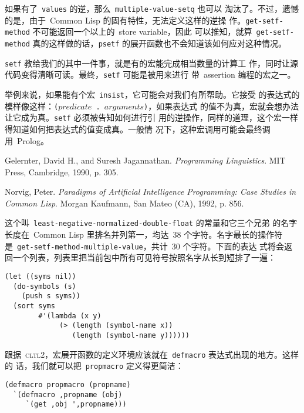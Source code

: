 \begin{notes}
如果有了~\texttt{values} 的逆，那么~\texttt{multiple-value-setq} 也可以
淘汰了。不过，遗憾的是，由于~Common Lisp 的固有特性，无法定义这样的逆操
作。\texttt{get-setf-method} 不可能返回一个以上的~store variable，因此
可以推知，就算~\texttt{get-setf-method} 真的这样做的话，\texttt{psetf}
的展开函数也不会知道该如何应对这种情况。


\texttt{setf} 教给我们的其中一件事，就是有的宏能完成相当数量的计算工
作，同时让源代码变得清晰可读。最终，\texttt{setf} 可能是被用来进行
带~assertion 编程的宏之一。

举例来说，如果能有个宏~\texttt{insist}，它可能会对我们有所帮助。它接受
的表达式的模样像这样：\texttt{($predicate$ . $arguments$)}，如果表达式
的值不为真，宏就会想办法让它成为真。\texttt{setf} 必须被告知如何进行引
用的逆操作，同样的道理，这个宏一样得知道如何把表达式的值变成真。一般情
况下，这种宏调用可能会最终调用~Prolog。


Gelernter, David H., and Suresh Jagannathan. \emph{Programming Linguistics}.
MIT Press, Cambridge, 1990, p. 305.


Norvig, Peter. \emph{Paradigms of Artificial Intelligence Programming: Case
Studies in Common Lisp}. Morgan Kaufmann, San Mateo (CA), 1992, p. 856.


这个叫~\texttt{least-negative-normalized-double-float} 的常量和它三个兄弟
的名字长度在~Common Lisp 里排名并列第一，均达~38 个字符。名字最长的操作符
是~\texttt{get-setf-method-multiple-value}，共计~30 个字符。下面的表达
式将会返回一个列表，列表里把当前包中所有可见符号按照名字从长到短排了一遍：
     
\begin{verbatim}
(let ((syms nil))
  (do-symbols (s)
    (push s syms))
  (sort syms
        #'(lambda (x y)
             (> (length (symbol-name x))
                (length (symbol-name y))))))
\end{verbatim}


\label{notes:difference-null-environment}
跟据~\textsc{cltl}2，宏展开函数的定义环境应该就在~\texttt{defmacro} 表达式出现的地方。这样的
话，我们就可以把~\texttt{propmacro} 定义得更简洁：

\begin{verbatim}
(defmacro propmacro (propname)
  `(defmacro ,propname (obj)
     `(get ,obj ',propname)))
\end{verbatim}


\end{notes}
